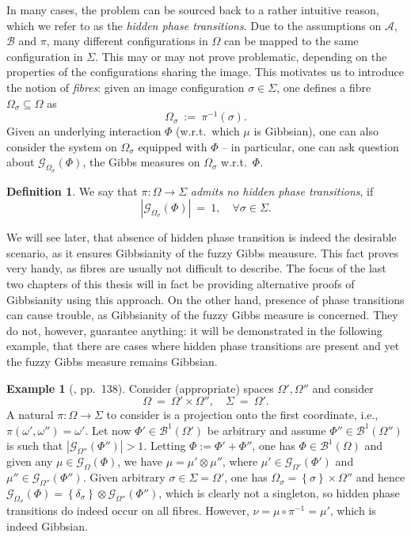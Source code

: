\documentclass[12pt]{article}
\newcommand{\A}{\mathcal{A}}
\newcommand{\B}{\mathcal{B}}
\newcommand{\BB}{\mathscr{B}}
\newcommand{\G}{\mathcal{G}}
\newcommand{\set}[1]{\left\{#1\right\}}
\newcommand{\ra}{\rightarrow}
\newcommand{\1}{\mathbbm{1}}
\newcommand{\5}{\vspace{0.5cm}}
\theoremstyle{definition}
\newtheorem{ex}[thm]{Example}
\newtheorem{df}[thm]{Definition}
\begin{document}
In many cases, the problem can be sourced back to a rather intuitive reason, which we refer to as the \textit{hidden phase transitions}. Due to the assumptions on $\A$, $\B$ and $\pi$, many different configurations in $\Omega$ can be mapped to the same configuration in $\Sigma$. This may or may not prove problematic, depending on the properties of the configurations sharing the image. This motivates us to introduce the notion of \textit{fibres}: given an image configuration $\sigma\in\Sigma$, one defines a fibre $\Omega_\sigma\subseteq\Omega$ as
$$\Omega_\sigma ~:=~ \pi^{-1}(\sigma).$$
Given an underlying interaction $\Phi$ (w.r.t.~which $\mu$ is Gibbsian), one can also consider the system on $\Omega_\sigma$ equipped with $\Phi$ -- in particular, one can ask question about $\G_{\Omega_\sigma}(\Phi)$, the Gibbs measures on $\Omega_\sigma$ w.r.t.~$\Phi$. 
\begin{df}
We say that $\pi:\Omega\ra\Sigma$ \textit{admits no hidden phase transitions}, if 
$$|\G_{\Omega_\sigma}(\Phi)| ~=~ 1, \quad \forall \sigma\in\Sigma.$$
\end{df}
We will see later, that absence of hidden phase transition is indeed the desirable scenario, as it ensures Gibbsianity of the fuzzy Gibbs meausure. This fact proves very handy, as fibres are usually not difficult to describe. The focus of the last two chapters of this thesis will in fact be providing alternative proofs of Gibbsianity using this approach. On the other hand, presence of phase transitions can cause trouble, as Gibbsianity of the fuzzy Gibbs measure is concerned. They do not, however, guarantee anything: it will be demonstrated in the following example, that there are cases where hidden phase transitions are present and yet the fuzzy Gibbs measure remains Gibbsian.

\begin{ex}[\cite{Ber}, pp.~138]
Consider (appropriate) spaces $\Omega',\Omega''$ and consider
$$\Omega~=~\Omega'\times\Omega'',\quad\Sigma~=~\Omega'.$$
A natural $\pi:\Omega\ra\Sigma$ to consider is a projection onto the first coordinate, i.e., $\pi(\omega',\omega'')=\omega'$. Let now $\Phi'\in\BB^1(\Omega')$ be arbitrary and assume $\Phi''\in\BB^1(\Omega'')$ is such that $|\G_{\Omega''}(\Phi'')|>1$. Letting $\Phi:=\Phi'+\Phi''$, one has $\Phi\in\BB^1(\Omega)$ and given any $\mu\in\G_{\Omega}(\Phi)$, we have $\mu=\mu'\otimes\mu''$, where $\mu'\in\G_{\Omega'}(\Phi')$ and $\mu''\in\G_{\Omega''}(\Phi'')$. Given arbitrary $\sigma\in\Sigma=\Omega'$, one has $\Omega_\sigma=\set{\sigma}\times\Omega''$ and hence $\G_{\Omega_\sigma}(\Phi)=\set{\delta_\sigma}\otimes\G_{\Omega''}(\Phi'')$, which is clearly not a singleton, so hidden phase transitions do indeed occur on all fibres. However, $\nu=\mu\circ\pi^{-1}=\mu'$, which is indeed Gibbsian.
\end{ex}
\end{document}
